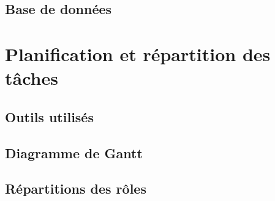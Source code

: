 \subsection{Base de données}


\section{Planification et répartition des tâches}

\subsection{Outils utilisés}


\subsection{Diagramme de Gantt}


\subsection{Répartitions des rôles}